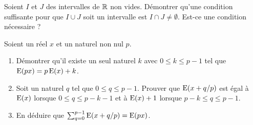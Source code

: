 \begin{exercice}
    Soient \(I\) et \(J\) des intervalles de \(\mathbb{R}\) non vides. Démontrer qu'une condition suffisante pour que \(I \cup J\) soit un intervalle est \(I \cap J \neq \emptyset\). Est-ce une condition nécessaire ?
\end{exercice}
\begin{exercice}
    Soient un réel \(x\) et un naturel non nul \(p\).
    \begin{enumerate}
        \item Démontrer qu'il existe un seul naturel \(k\) avec \(0 \leqslant k \leqslant p-1\) tel que \(\operatorname{E}(px) = p\operatorname{E}(x)+k\).
        \item Soit un naturel \(q\) tel que \(0 \leqslant q \leqslant p-1\). Prouver que \(\operatorname{E}(x+q/p)\) est égal à \(\operatorname{E}(x)\) lorsque \(0 \leqslant q \leqslant p-k-1\) et à \(\operatorname{E}(x)+1\) lorsque \(p-k\leqslant q \leqslant p-1\).
        \item En déduire que \(\sum_{q=0}^{p-1} \operatorname{E}(x+q/p) = \operatorname{E}(px)\).
    \end{enumerate}
\end{exercice}

